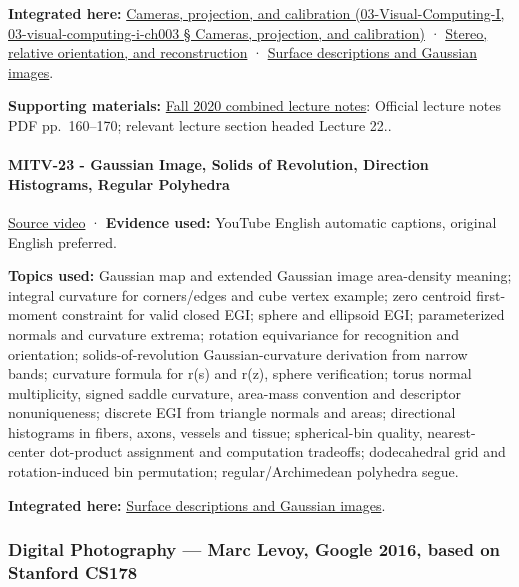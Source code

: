 \textbf{Integrated here:} \href{}{Cameras, projection, and calibration (03-Visual-Computing-I, 03-visual-computing-i-ch003 § Cameras, projection, and calibration)} · \hyperref[04-visual-computing-ii-ch032]{Stereo, relative orientation, and reconstruction} · \hyperref[04-visual-computing-ii-ch032]{Surface descriptions and Gaussian images}.

\textbf{Supporting materials:} \href{https://ocw.mit.edu/courses/6-801-machine-vision-fall-2020/9ec44f69e72995c370b3797818ba01e6_MIT6_801F20_lectureNotes.pdf}{Fall 2020 combined lecture notes}: Official lecture notes PDF pp.~160--170; relevant lecture section headed Lecture 22..

\paragraph{MITV-23 - Gaussian Image, Solids of Revolution, Direction Histograms, Regular Polyhedra}\label{mitv-23---gaussian-image-solids-of-revolution-direction-histograms-regular-polyhedra}

\href{https://www.youtube.com/watch?v=s9wu_z8EKAc}{Source video} · \textbf{Evidence used:} YouTube English automatic captions, original English preferred.

\textbf{Topics used:} Gaussian map and extended Gaussian image area-density meaning; integral curvature for corners/edges and cube vertex example; zero centroid first-moment constraint for valid closed EGI; sphere and ellipsoid EGI; parameterized normals and curvature extrema; rotation equivariance for recognition and orientation; solids-of-revolution Gaussian-curvature derivation from narrow bands; curvature formula for r(s) and r(z), sphere verification; torus normal multiplicity, signed saddle curvature, area-mass convention and descriptor nonuniqueness; discrete EGI from triangle normals and areas; directional histograms in fibers, axons, vessels and tissue; spherical-bin quality, nearest-center dot-product assignment and computation tradeoffs; dodecahedral grid and rotation-induced bin permutation; regular/Archimedean polyhedra segue.

\textbf{Integrated here:} \hyperref[04-visual-computing-ii-ch032]{Surface descriptions and Gaussian images}.

\subsubsection{Digital Photography --- Marc Levoy, Google 2016, based on Stanford CS178}\label{digital-photography-marc-levoy-google-2016-based-on-stanford-cs178}

